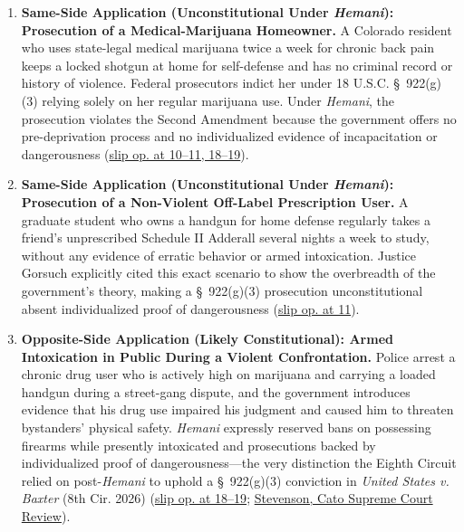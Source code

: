 \documentclass[12pt]{article}
\begin{document}
\begin{enumerate}
\item \textbf{Same-Side Application (Unconstitutional Under \textit{Hemani}): Prosecution of a Medical-Marijuana Homeowner.} A Colorado resident who uses state-legal medical marijuana twice a week for chronic back pain keeps a locked shotgun at home for self-defense and has no criminal record or history of violence. Federal prosecutors indict her under 18 U.S.C. \S~922(g)(3) relying solely on her regular marijuana use. Under \textit{Hemani}, the prosecution violates the Second Amendment because the government offers no pre-deprivation process and no individualized evidence of incapacitation or dangerousness (\href{https://supreme.justia.com/cases/federal/us/608/24-1234/}{slip op. at 10--11, 18--19}).

\item \textbf{Same-Side Application (Unconstitutional Under \textit{Hemani}): Prosecution of a Non-Violent Off-Label Prescription User.} A graduate student who owns a handgun for home defense regularly takes a friend's unprescribed Schedule II Adderall several nights a week to study, without any evidence of erratic behavior or armed intoxication. Justice Gorsuch explicitly cited this exact scenario to show the overbreadth of the government's theory, making a \S~922(g)(3) prosecution unconstitutional absent individualized proof of dangerousness (\href{https://supreme.justia.com/cases/federal/us/608/24-1234/}{slip op. at 11}).

\item \textbf{Opposite-Side Application (Likely Constitutional): Armed Intoxication in Public During a Violent Confrontation.} Police arrest a chronic drug user who is actively high on marijuana and carrying a loaded handgun during a street-gang dispute, and the government introduces evidence that his drug use impaired his judgment and caused him to threaten bystanders' physical safety. \textit{Hemani} expressly reserved bans on possessing firearms while presently intoxicated and prosecutions backed by individualized proof of dangerousness---the very distinction the Eighth Circuit relied on post-\textit{Hemani} to uphold a \S~922(g)(3) conviction in \textit{United States v. Baxter} (8th Cir. 2026) (\href{https://supreme.justia.com/cases/federal/us/608/24-1234/}{slip op. at 18--19}; \href{https://www.cato.org/sites/cato.org/files/2026-09/2025-2026-Supreme-Court-Review-7.pdf}{Stevenson, Cato Supreme Court Review}).


\end{enumerate}
\end{document}
